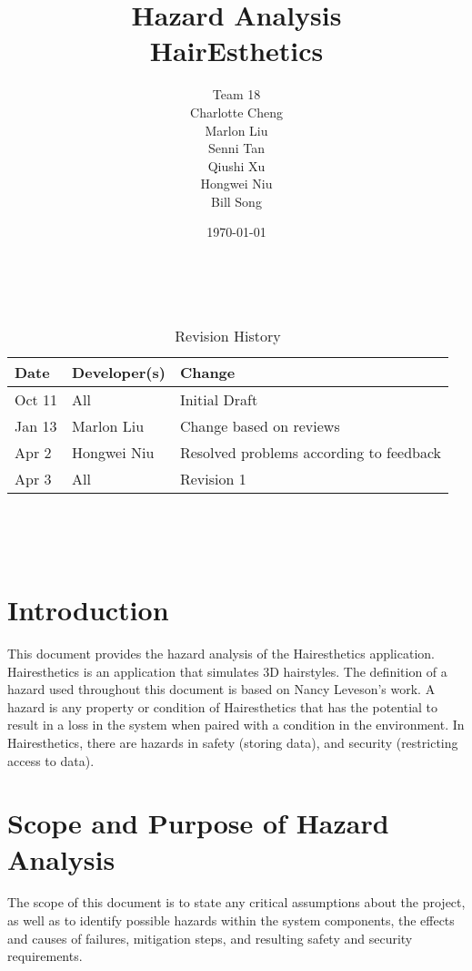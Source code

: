 \documentclass{article}
\title{Hazard Analysis\\HairEsthetics}
\author{Team 18 \\ Charlotte Cheng
        \\ Marlon Liu
        \\ Senni Tan
        \\ Qiushi Xu
        \\ Hongwei Niu
        \\ Bill Song
}
\date{\today}
\begin{document}
\maketitle
\thispagestyle{empty}

~\newpage


\begin{table}[hp]
\caption{Revision History} \label{TblRevisionHistory}
\begin{tabularx}{\textwidth}{llX}
\toprule
\textbf{Date} & \textbf{Developer(s)} & \textbf{Change}\\
\midrule
Oct 11 & All & Initial Draft\\
Jan 13 & Marlon Liu & Change based on reviews\\
Apr 2 & Hongwei Niu & Resolved problems according to feedback\\
Apr 3 & All & Revision 1\\
\bottomrule
\end{tabularx}
\end{table}

~\newpage

\tableofcontents
\listoftables

~\newpage



\section{Introduction}

This document provides the hazard analysis of the Hairesthetics application. Hairesthetics is an application that simulates 3D hairstyles. The definition of a hazard used throughout this document is based on Nancy Leveson's work. A hazard is any property or condition of Hairesthetics that has the potential to result in a loss in the system when paired with a condition in the environment. In Hairesthetics, there are hazards in safety (storing data), and security (restricting access to data). 

\section{Scope and Purpose of Hazard Analysis}
The scope of this document is to state any critical assumptions about the project, as well as to identify possible hazards within the system components, the effects and causes of failures, mitigation steps, and resulting safety and security requirements.
\end{document}
